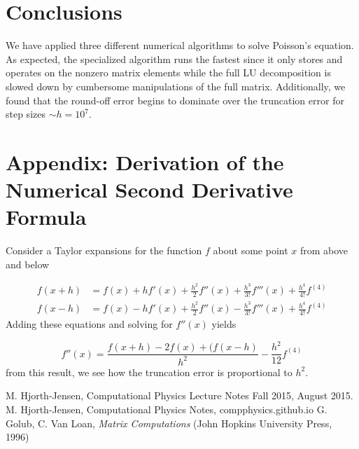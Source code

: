 \documentclass[10pt,showpacs,preprintnumbers,footinbib,amsmath,amssymb,aps,prl,twocolumn,groupedaddress,superscriptaddress,showkeys]{revtex4-1}
\begin{document}
\section{Conclusions}

We have applied three different numerical algorithms to solve Poisson's
equation. As expected, the specialized algorithm runs the fastest since
it only stores and operates on the nonzero matrix elements while
the full LU decomposition is slowed down by cumbersome manipulations of
the full matrix. Additionally, we found that the round-off error begins
to dominate over the truncation error for step sizes $\sim h=10^7$.

\section{Appendix: Derivation of the Numerical Second Derivative Formula}

Consider a Taylor expansions for the function $f$ about some point $x$ from
above and below

\begin{align*}
	f(x+h) &= f(x) + h f'(x) + \frac{h^2}{2} f''(x) + \frac{h^3}{3!} f'''(x) +
	\frac{h^4}{4!} f^{(4)}\\
	f(x-h) &= f(x) - h f'(x) + \frac{h^2}{2} f''(x) - \frac{h^3}{3!} f'''(x) +
	\frac{h^4}{4!} f^{(4)}
\end{align*}
Adding these equations and solving for $f''(x)$ yields

\begin{equation*}
	f''(x) = \frac{f(x+h) - 2f(x) + (f(x-h)}{h^2} - \frac{h^2}{12}f^{(4)}
\end{equation*}
from this result, we see how the truncation error is proportional to $h^2$.


\begin{thebibliography}{99}
 M. Hjorth-Jensen, Computational Physics Lecture Notes Fall 2015, August 2015.
 M. Hjorth-Jensen, Computational Physics Notes, compphysics.github.io
 G. Golub, C. Van Loan, \textit{Matrix Computations} (John Hopkins University Press, 1996)
\end{thebibliography}
\end{document}
